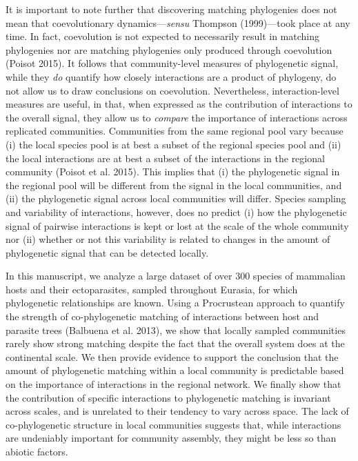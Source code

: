 \documentclass[12pt]{article}
\begin{document}
It is important to note further that discovering matching phylogenies
does not mean that coevolutionary dynamics---\emph{sensu} Thompson
(1999)---took place at any time. In fact, coevolution is not expected to
necessarily result in matching phylogenies nor are matching phylogenies
only produced through coevolution (Poisot 2015). It follows that
community-level measures of phylogenetic signal, while they \emph{do}
quantify how closely interactions are a product of phylogeny, do not
allow us to draw conclusions on coevolution. Nevertheless,
interaction-level measures are useful, in that, when expressed as the
contribution of interactions to the overall signal, they allow us to
\emph{compare} the importance of interactions across replicated
communities. Communities from the same regional pool vary because (i)
the local species pool is at best a subset of the regional species pool
and (ii) the local interactions are at best a subset of the interactions
in the regional community (Poisot et al. 2015). This implies that (i)
the phylogenetic signal in the regional pool will be different from the
signal in the local communities, and (ii) the phylogenetic signal across
local communities will differ. Species sampling and variability of
interactions, however, does no predict (i) how the phylogenetic signal
of pairwise interactions is kept or lost at the scale of the whole
community nor (ii) whether or not this variability is related to changes
in the amount of phylogenetic signal that can be detected locally.

In this manuscript, we analyze a large dataset of over 300 species of
mammalian hosts and their ectoparasites, sampled throughout Eurasia, for
which phylogenetic relationships are known. Using a Procrustean approach
to quantify the strength of co-phylogenetic matching of interactions
between host and parasite trees (Balbuena et al. 2013), we show that
locally sampled communities rarely show strong matching despite the fact
that the overall system does at the continental scale. We then provide
evidence to support the conclusion that the amount of phylogenetic
matching within a local community is predictable based on the importance
of interactions in the regional network. We finally show that the
contribution of specific interactions to phylogenetic matching is
invariant across scales, and is unrelated to their tendency to vary
across space. The lack of co-phylogenetic structure in local communities
suggests that, while interactions are undeniably important for community
assembly, they might be less so than abiotic factors.
\end{document}
